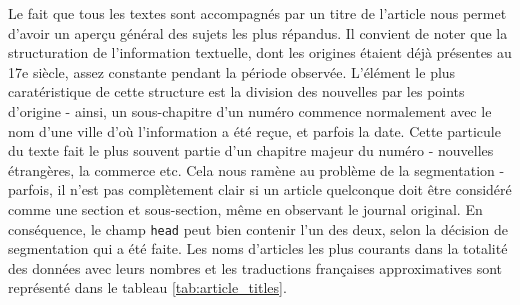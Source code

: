 \documentclass[a4paper,twoside,12pt]{article}
\begin{document}
Le fait que tous les textes sont accompagnés par un titre de l'article nous permet d'avoir un aperçu général des sujets les plus répandus. Il convient de noter que la structuration de l'information textuelle, dont les origines étaient déjà présentes au 17e siècle, assez constante pendant la période observée. L'élément le plus caratéristique de cette structure est la division des nouvelles par les points d'origine - ainsi, un \og sous-chapitre \fg{} d'un numéro commence normalement avec le nom d'une ville d'où l'information a été reçue, et parfois la date. Cette particule du texte fait le plus souvent partie d'un chapitre majeur du numéro - nouvelles étrangères, la commerce etc. Cela nous ramène au problème de la segmentation - parfois, il n'est pas complètement clair si un article quelconque doit être considéré comme une section et sous-section, même en observant le journal original. En conséquence, le champ \texttt{head} peut bien contenir l'un des deux, selon la décision de segmentation qui a été faite. Les noms d'articles les plus courants dans la totalité des données avec leurs nombres et les traductions françaises approximatives sont représenté dans le tableau \ref{tab:article_titles}.
\end{document}

